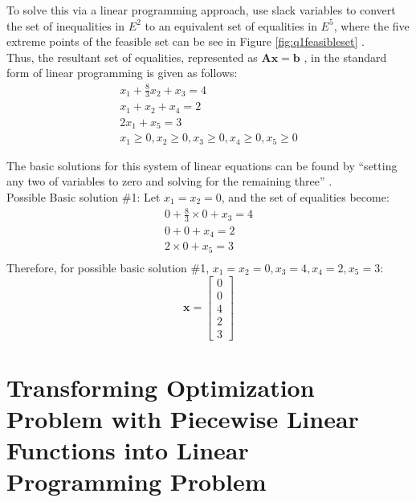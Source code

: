 \documentclass[letter,12pt]{article}
\begin{document}
To solve this via a linear programming approach, use slack variables to convert the set of inequalities in $E^{2}$ to an equivalent set of equalities in $E^{5}$, where the five extreme points of the feasible set can be see in Figure \ref{fig:q1feasibleset} \cite[\S2.1, pages 12]{Luenberger2008}. \\

Thus, the resultant set of equalities, represented as $\mathbf{Ax = b}$ \cite[\S2.1, page 19]{Luenberger2008}, in the standard form \cite[\S2.1, pages 11]{Luenberger2008} of linear programming is given as follows:
\begin{eqnarray*}
x_{1} + \frac{8}{3}x_{2} + x_{3} = 4 \\
x_{1} + x_{2} + x_{4} = 2 \\
2x_{1} + x_{5} = 3 \\
x_{1} \geq 0, x_{2} \geq 0, x_{3} \geq 0, x_{4} \geq 0, x_{5} \geq 0
\end{eqnarray*}

The basic solutions for this system of linear equations can be found by ``setting any two of variables to zero and solving for the remaining three'' \cite[\S2.5, page 26]{Luenberger2008}. \\

Possible Basic solution \#1:
Let $x_{1} = x_{2} = 0$, and the set of equalities become:
\begin{eqnarray*}
0 + \frac{8}{3} \times 0 + x_{3} = 4 \\
0 + 0 + x_{4} = 2 \\
2 \times 0 + x_{5} = 3 \\
\end{eqnarray*}
Therefore, for possible basic solution \#1, $x_{1} = x_{2} = 0, x_{3} = 4, x_{4} = 2, x_{5} = 3$:
\begin{equation}
\mathbf{x} = \left[
	\begin{array}{c}
	0 \\ 0 \\ 4 \\ 2 \\ 3
	\end{array}
	\right]
\end{equation}


\section{Transforming Optimization Problem with Piecewise Linear Functions into Linear Programming Problem}
\label{sec:optimizationproblemtransformation}
\end{document}
